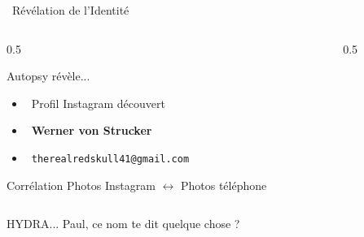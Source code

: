\documentclass{beamer}
\begin{document}
\begin{frame}{\faUser \, Révélation de l'Identité}
\begin{columns}
\begin{column}{0.5\textwidth}
\begin{block}{Autopsy révèle...}
\begin{itemize}
    \item \faInstagram \, Profil Instagram découvert
    \item \faUser \, \textbf{Werner von Strucker}
    \item \faAt \, \texttt{therealredskull41@gmail.com}
\end{itemize}
\end{block}

\begin{alertblock}{Corrélation}
Photos Instagram $\leftrightarrow$ Photos téléphone
\end{alertblock}
\end{column}

\begin{column}{0.5\textwidth}
\begin{center}
\fbox{\begin{minipage}{3cm}
\centering
\textcolor{gray}{Photo\\Werner\\von Strucker}
\end{minipage}}
\end{center}
\end{column}
\end{columns}

\pause
\begin{center}
\Large{\textcolor{crimsonred}{HYDRA... Paul, ce nom te dit quelque chose ?}}
\end{center}
\end{frame}
\end{document}
